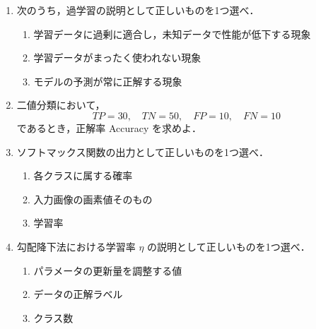 \documentclass[uplatex,a4paper,12pt]{jsarticle}
\begin{document}
\begin{enumerate}
「学習に使用していない未知のデータに対する予測性能」
\begin{enumerate}[label=(\alph*)]
\item 汎化性能
\item 過学習
\item バッチサイズ
\end{enumerate}

\item 次のうち，過学習の説明として正しいものを1つ選べ．
\begin{enumerate}[label=(\alph*)]
\item 学習データに過剰に適合し，未知データで性能が低下する現象
\item 学習データがまったく使われない現象
\item モデルの予測が常に正解する現象
\end{enumerate}

\item 二値分類において，
\[
TP=30,\quad TN=50,\quad FP=10,\quad FN=10
\]
であるとき，正解率 Accuracy を求めよ．

\item ソフトマックス関数の出力として正しいものを1つ選べ．
\begin{enumerate}[label=(\alph*)]
\item 各クラスに属する確率
\item 入力画像の画素値そのもの
\item 学習率
\end{enumerate}

\item 勾配降下法における学習率 $\eta$ の説明として正しいものを1つ選べ．
\begin{enumerate}[label=(\alph*)]
\item パラメータの更新量を調整する値
\item データの正解ラベル
\item クラス数
\end{enumerate}

\end{enumerate}
\end{document}
